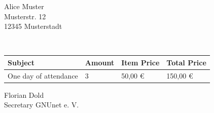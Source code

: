 \documentclass[DIN, pagenumber=false, parskip=half,
               fromalign=right, fromphone=false, fromfax=false, frombank=true,
               yourmail=false,
               yourref=false,
               fromrule=false]{scrlttr2}
\begin{document}
 
\begin{letter}{
	Alice Muster \\ 
	Musterstr. 12\\
	12345 Musterstadt
}

\opening{\ }
\vspace{-1.5cm}

\begin{longtable}{p{5cm}p{1.5cm}p{3.5cm}p{3.5cm}}
	\hline 	
	Subject & Amount & Item Price & Total Price \\
	\hline 
	
	One day of attendance & 3 & 50,00 \euro{} & 150,00 \euro{}\\
	
	\hline\hline 
\end{longtable}




\vspace{3cm}
Florian Dold\\
Secretary GNUnet e. V.


\end{letter}
\end{document}
